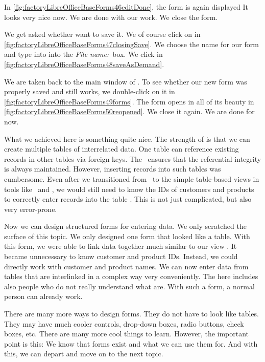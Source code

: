 In \cref{fig:factoryLibreOfficeBaseForms46editDone}, the form is again displayed 
It looks very nice now.
We are done with our work.
We close the form.

We get asked whether want to save it.
We of course click on  in \cref{fig:factoryLibreOfficeBaseForms47closingSave}.
We choose the name  for our form and type into into the \emph{File name:}~box.
We click  in \cref{fig:factoryLibreOfficeBaseForms48saveAsDemand}.

We are taken back to the main window of \libreofficeBase.
To see whether our new  form was properly saved and still works, we double-click on it in \cref{fig:factoryLibreOfficeBaseForms49forms}.
The form opens in all of its beauty in \cref{fig:factoryLibreOfficeBaseForms50reopened}.
We close it again.
We are done for now.

What we achieved here is something quite nice.
The strength of  is that we can create multiple tables of interrelated data.
One table can reference existing records in other tables via foreign keys.
The \dbms\ ensures that the referential integrity is always maintained.
However, inserting records into such tables was cumbersome.
Even after we transitioned from \sql\ to the simple table-based views in tools like \microsoftAccess\ and \libreofficeBase, we would still need to know the IDs of customers and products to correctly enter records into the table .
This is not just complicated, but also very error-prone.

Now we can design structured forms for entering data.
We only scratched the surface of this topic.
We only designed one form that looked like a table.
With this form, we were able to link data together much similar to our view .
It became unnecessary to know customer and product IDs.
Instead, we could directly work with customer and product names.
We can now enter data from tables that are interlinked in a complex way very conveniently.
The  here includes also people who do not really understand what  are.
With such a form, a normal person can already work.

There are many more ways to design forms.
They do not have to look like tables.
They may have much cooler controls, drop-down boxes, radio buttons, check boxes, etc.
There are many more cool things to learn.
However, the important point is this:
We know that forms exist and what we can use them for.
And with this, we can depart and move on to the next topic.%
%
\FloatBarrier%
\endhsection%
%

